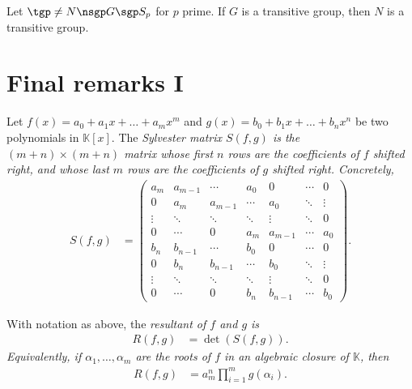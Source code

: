 \documentclass{article}
\begin{document}
\begin{tlemma}
  Let \( \tgp \neq N \nsgp G \sgp S_p \) for \( p \) prime.
  If \( G \) is a transitive group, then \( N \) is a transitive group.
\end{tlemma}

\section{Final remarks I}
\begin{tdefinition}
Let \(f(x)=a_{0}+a_{1}x+\dots+a_{m}x^{m}\) and \(g(x)=b_{0}+b_{1}x+\dots+b_{n}x^{n}\) be two polynomials in \(\mathbb{K}[x]\).
The \it{Sylvester matrix} \(S(f,g)\) is the \((m+n)\times(m+n)\) matrix whose first \(n\) rows are the coefficients of \(f\) shifted right, and whose last \(m\) rows are the coefficients of \(g\) shifted right.
Concretely,
\begin{align*}
S(f,g) &= \begin{pmatrix}
a_{m}  & a_{m-1} & \cdots & a_{0}  & 0      & \cdots & 0      \\
0      & a_{m}   & a_{m-1}& \cdots & a_{0}  & \ddots & \vdots \\
\vdots & \ddots  & \ddots & \ddots & \vdots & \ddots & 0      \\
0      & \cdots  & 0      & a_{m}  & a_{m-1}& \cdots & a_{0}  \\
b_{n}  & b_{n-1} & \cdots & b_{0}  & 0      & \cdots & 0      \\
0      & b_{n}   & b_{n-1}& \cdots & b_{0}  & \ddots & \vdots \\
\vdots & \ddots  & \ddots & \ddots & \vdots & \ddots & 0      \\
0      & \cdots  & 0      & b_{n}  & b_{n-1}& \cdots & b_{0}
\end{pmatrix}.
\end{align*}
\end{tdefinition}

\begin{tdefinition}[Resultant]
With notation as above, the \it{resultant} of \(f\) and \(g\) is
\begin{align*}
R(f,g) &= \det\left(S(f,g)\right).
\end{align*}
Equivalently, if \(\alpha_{1},\dots,\alpha_{m}\) are the roots of \(f\) in an algebraic closure of \(\mathbb{K}\), then
\begin{align*}
R(f,g) &= a_{m}^{n}\prod_{i=1}^{m}g(\alpha_{i}).
\end{align*}
\end{tdefinition}
\end{document}
